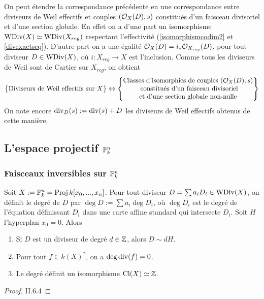 On peut étendre la correspondance précédente en une correspondance entre diviseurs de Weil effectifs et couples $(\mathcal{O}_X(D),s)$ constitués d'un faisceau divisoriel et d'une section globale. En effet on a d'une part un isomorphisme $\operatorname{WDiv}(X)\simeq\operatorname{WDiv}(X_{reg})$ respectant l'effectivité (\ref{isomorphismcodim2} et \ref{divexactseq}). D'autre part on a une égalité $\mathcal{O}_X(D)= i_*\mathcal{O}_{X_{reg}}(D)$, pour tout diviseur $D\in\operatorname{WDiv}(X)$, où $i:X_{reg}\rightarrow X$ est l'inclusion. Comme tous les diviseurs de Weil sont de Cartier sur $X_{reg}$, on obtient
$$
\left\{
\begin{matrix}
\text{Diviseurs de Weil effectifs sur }X
\end{matrix}
\right\}
\leftrightarrow
\left\{
\begin{matrix}
\text{Classes d'isomorphies de couples }(\mathcal{O}_X(D), s)\\
\text{ constitués d'un faisceau divisoriel}\\
\text{et d'une section globale non-nulle}
\end{matrix}
\right\}
$$
On note encore $\operatorname{div}_D(s):=\operatorname{div}(s)+D$ les diviseurs de Weil effectifs obtenus de cette manière.
\subsection{L'espace projectif $\mathbb{P}_k^n$}

\subsubsection{Faisceaux inversibles sur $\mathbb{P}_k^n$}

\begin{prop}
Soit $X:=\mathbb{P}_k^n=\operatorname{Proj} k[x_0,...,x_n]$. Pour tout diviseur $D=\sum a_i D_i\in\operatorname{WDiv}(X)$, on définit le degré de $D$ par $\deg D:=\sum a_i\deg D_i$, où $\deg D_i$ est le degré de l'équation définissant $D_i$ dans une carte affine standard qui intersecte $D_i$. Soit $H$ l'hyperplan $x_0=0$. Alors
\begin{enumerate}
\item Si $D$ est un diviseur de degré $d\in \mathbb{Z}$, alors $D\sim dH$.
\item Pour tout $f\in k(X)^*$, on a $\deg\operatorname{div}(f)=0$.
\item Le degré définit un isomorphisme $\operatorname{Cl}(X)\simeq \mathbb{Z}$.
\end{enumerate}
\end{prop}
\begin{proof}
\cite{Hartshorne} II.6.4
\end{proof}

